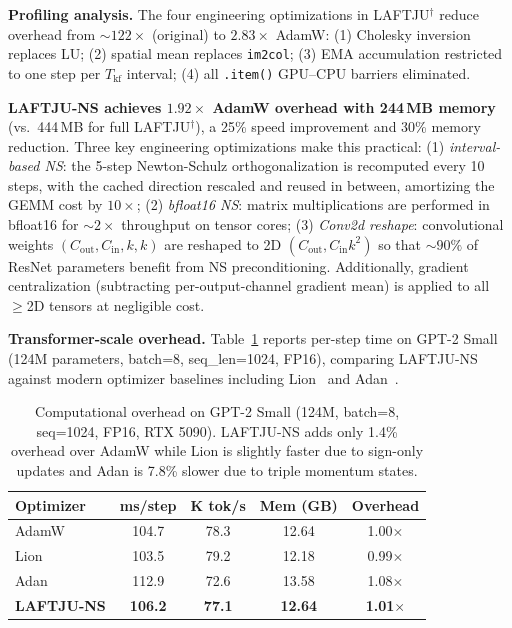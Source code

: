 \documentclass[10pt,twocolumn]{article}
\newcommand{\method}{LAFTJU}
\begin{document}
\textbf{Profiling analysis.} The four engineering optimizations in \method{}$^\dagger$ reduce overhead from $\sim\!122\times$ (original) to $2.83\times$ AdamW: (1) Cholesky inversion replaces LU; (2) spatial mean replaces \texttt{im2col}; (3) EMA accumulation restricted to one step per $T_{\text{kf}}$ interval; (4) all \texttt{.item()} GPU--CPU barriers eliminated.

\textbf{\method{}-NS achieves $\mathbf{1.92\times}$ AdamW overhead with 244\,MB memory} (vs.\ 444\,MB for full \method{}$^\dagger$), a 25\% speed improvement and 30\% memory reduction. Three key engineering optimizations make this practical: (1) \emph{interval-based NS}: the 5-step Newton-Schulz orthogonalization is recomputed every 10 steps, with the cached direction rescaled and reused in between, amortizing the GEMM cost by $10\times$; (2) \emph{bfloat16 NS}: matrix multiplications are performed in bfloat16 for $\sim\!2\times$ throughput on tensor cores; (3) \emph{Conv2d reshape}: convolutional weights $(C_{\text{out}}, C_{\text{in}}, k, k)$ are reshaped to 2D $(C_{\text{out}}, C_{\text{in}} k^2)$ so that $\sim\!90\%$ of ResNet parameters benefit from NS preconditioning. Additionally, gradient centralization (subtracting per-output-channel gradient mean) is applied to all $\geq$2D tensors at negligible cost.

\textbf{Transformer-scale overhead.} Table~\ref{tab:overhead_gpt2} reports per-step time on GPT-2 Small (124M parameters, batch=8, seq\_len=1024, FP16), comparing \method{}-NS against modern optimizer baselines including Lion~\cite{lion} and Adan~\cite{adan}.

\begin{table}[ht]
\centering
\caption{Computational overhead on GPT-2 Small (124M, batch=8, seq=1024, FP16, RTX 5090). \method{}-NS adds only 1.4\% overhead over AdamW while Lion is slightly faster due to sign-only updates and Adan is 7.8\% slower due to triple momentum states.}
\label{tab:overhead_gpt2}
\small
\begin{tabular}{@{}lcccc@{}}
\toprule
\textbf{Optimizer} & \textbf{ms/step} & \textbf{K tok/s} & \textbf{Mem (GB)} & \textbf{Overhead} \\
\midrule
AdamW                    & 104.7 & 78.3 & 12.64 & 1.00$\times$ \\
Lion~\cite{lion}         & 103.5 & 79.2 & 12.18 & 0.99$\times$ \\
Adan~\cite{adan}         & 112.9 & 72.6 & 13.58 & 1.08$\times$ \\
\textbf{\method{}-NS}    & \textbf{106.2} & \textbf{77.1} & \textbf{12.64} & \textbf{1.01$\times$} \\
\bottomrule
\end{tabular}
\end{table}
\end{document}
